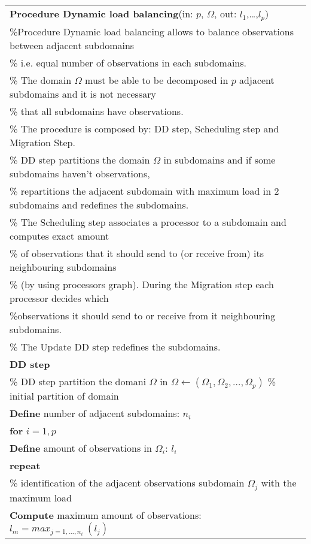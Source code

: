 \documentclass[10pt]{article}
\begin{document}
\begin{table}[ht!]
\label{tab}
\begin{tabular}{l}
\hline
\textbf{Procedure Dynamic load balancing}(in: $p$, $\Omega$, out: $l_1$,\ldots,$l_p$) \\

\%Procedure Dynamic load balancing allows to balance observations between adjacent subdomains \\
\% i.e. equal number of observations in each subdomains.\\ 
\% The domain $\Omega$ must be able to be decomposed in $p$ adjacent subdomains and it is not necessary \\ \% that all subdomains have observations.\\
\% The procedure is composed by: DD step, Scheduling step and Migration Step.\\ 
\% DD step partitions the domain $\Omega$ in subdomains and if some subdomains haven't observations,\\ 
\% repartitions the adjacent subdomain with maximum load in 2 subdomains and redefines the subdomains. \\ 
\% The Scheduling step
associates a processor to a subdomain and computes exact amount \\ 
\% of observations that it should send to (or receive from) its neighbouring subdomains\\
\% (by using processors graph). During the Migration step each processor decides which\\ 
\%observations it should send to or receive from it neighbouring subdomains. \\
\% The Update DD step redefines the subdomains.

\\

\textbf{DD step}\\ 
\% DD step partition the domani $\Omega$ in 
$\Omega\leftarrow (\Omega_{1},\Omega_{2},\ldots,\Omega_{p})$  \% initial partition of domain\\
\textbf{Define} number of adjacent subdomains: $n_{i}$ \\
\textbf{for} $i=1,p$\\
\textbf{Define} amount of observations in $\Omega_i$: $l_i$\\
\textbf{repeat}\\
\% identification of the adjacent observations subdomain  $\Omega_j$ with the maximum load\\
\textbf{Compute} maximum amount of observations: $l_m=max_{j=1,\ldots, n_{i}}\ (l_{j})$\\ 


\end{tabular}
\end{table}
\end{document}

